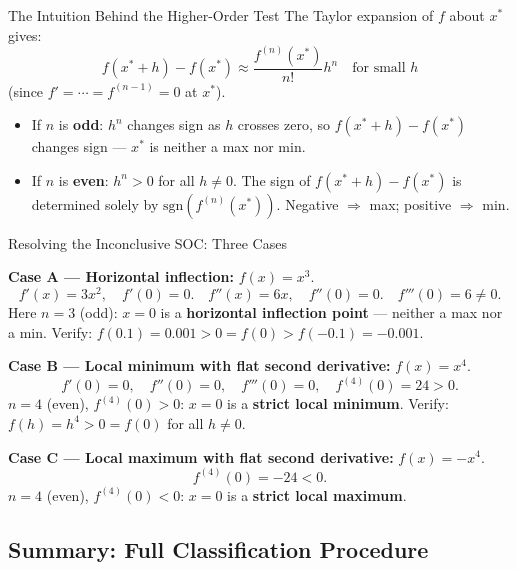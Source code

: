 \documentclass[12pt, a4paper]{article}
\theoremstyle{definition}
\begin{document}
\begin{keybox}{The Intuition Behind the Higher-Order Test}
The Taylor expansion of $f$ about $x^*$ gives:
\[
  f(x^*+h) - f(x^*)
  \approx \frac{f^{(n)}(x^*)}{n!}h^n
  \quad \text{for small } h
\]
(since $f'= \cdots = f^{(n-1)} = 0$ at $x^*$).

\begin{itemize}
  \item If $n$ is \textbf{odd}: $h^n$ changes sign as $h$ crosses zero,
        so $f(x^*+h)-f(x^*)$ changes sign --- $x^*$ is neither a max nor min.
  \item If $n$ is \textbf{even}: $h^n > 0$ for all $h \neq 0$.  The sign of
        $f(x^*+h)-f(x^*)$ is determined solely by $\text{sgn}(f^{(n)}(x^*))$.
        Negative $\Rightarrow$ max; positive $\Rightarrow$ min.
\end{itemize}
\end{keybox}

\begin{exbox}{Resolving the Inconclusive SOC: Three Cases}

\textbf{Case A --- Horizontal inflection:}
$f(x) = x^3$.
\[
  f'(x) = 3x^2, \quad f'(0) = 0.
  \quad f''(x) = 6x, \quad f''(0) = 0.
  \quad f'''(0) = 6 \neq 0.
\]
Here $n=3$ (odd): $x=0$ is a \textbf{horizontal inflection point} ---
neither a max nor a min.  Verify: $f(0.1)=0.001>0=f(0)>f(-0.1)=-0.001$.

\medskip
\textbf{Case B --- Local minimum with flat second derivative:}
$f(x) = x^4$.
\[
  f'(0)=0,\quad f''(0)=0,\quad f'''(0)=0,\quad f^{(4)}(0)=24>0.
\]
$n=4$ (even), $f^{(4)}(0)>0$: $x=0$ is a \textbf{strict local minimum}.
Verify: $f(h)=h^4>0=f(0)$ for all $h\neq 0$. \checkmark

\medskip
\textbf{Case C --- Local maximum with flat second derivative:}
$f(x) = -x^4$.
\[
  f^{(4)}(0) = -24 < 0.
\]
$n=4$ (even), $f^{(4)}(0)<0$: $x=0$ is a \textbf{strict local maximum}.
\end{exbox}

\subsection{Summary: Full Classification Procedure}
\end{document}

